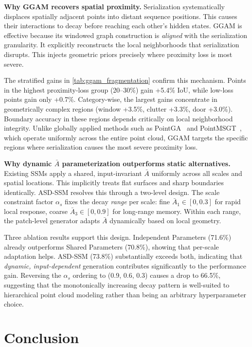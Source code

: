 \documentclass[a4paper,fleqn]{cas-sc}
\begin{document}
\textbf{Why GGAM recovers spatial proximity.}
Serialization systematically displaces spatially adjacent points into distant sequence positions. This causes their interactions to decay before reaching each other's hidden states. GGAM is effective because its windowed graph construction is \emph{aligned} with the serialization granularity. It explicitly reconstructs the local neighborhoods that serialization disrupts. This injects geometric priors precisely where proximity loss is most severe.

The stratified gains in \cref{tab:ggam_fragmentation} confirm this mechanism. Points in the highest proximity-loss group (20--30\%) gain +5.4\% IoU, while low-loss points gain only +0.7\%. Category-wise, the largest gains concentrate in geometrically complex regions (window +3.5\%, clutter +3.3\%, door +3.0\%). Boundary accuracy in these regions depends critically on local neighborhood integrity. Unlike globally applied methods such as PointGA~\cite{pointga} and PointMSGT~\cite{pointmsgt}, which operate uniformly across the entire point cloud, GGAM targets the specific regions where serialization causes the most severe proximity loss.

\textbf{Why dynamic $\bar{A}$ parameterization outperforms static alternatives.}
Existing SSMs apply a shared, input-invariant $\bar{A}$ uniformly across all scales and spatial locations. This implicitly treats flat surfaces and sharp boundaries identically. ASD-SSM resolves this through a two-level design. The scale constraint factor $\alpha_s$ fixes the decay \emph{range} per scale: fine $\bar{A}_1 \in [0,0.3]$ for rapid local response, coarse $\bar{A}_3 \in [0,0.9]$ for long-range memory. Within each range, the patch-level generator adapts $\bar{A}$ dynamically based on local geometry.

Three ablation results support this design. Independent Parameters (71.6\%) already outperforms Shared Parameters (70.8\%), showing that per-scale adaptation helps. ASD-SSM (73.8\%) substantially exceeds both, indicating that \emph{dynamic, input-dependent} generation contributes significantly to the performance gain. Reversing the $\alpha_s$ ordering to (0.9, 0.6, 0.3) causes a drop to 66.5\%, suggesting that the monotonically increasing decay pattern is well-suited to hierarchical point cloud modeling rather than being an arbitrary hyperparameter choice.

\section{Conclusion}\label{sec:conclusion}
\end{document}
